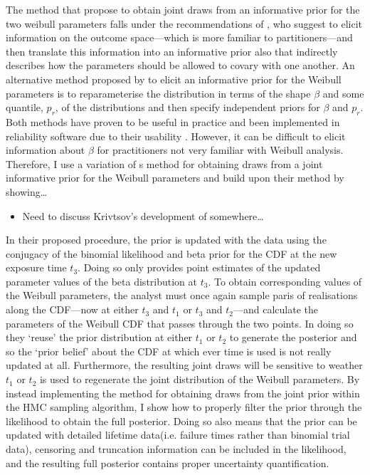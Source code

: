 The method that \citet{kaminskiy2005} propose to obtain joint draws from an informative prior for the two weibull parameters falls under the recommendations of \citet{gelman_workflow_2020}, who suggest to elicit information on the outcome space---which is more familiar to partitioners---and then translate this information into an informative prior also that indirectly describes how the parameters should be allowed to covary with one another. An alternative method proposed by \citep{Meeker2022} to elicit an informative prior for the Weibull parameters is to reparameterise the distribution in terms of the shape $\beta$ and some quantile, $p_r$, of the distributions and then specify independent priors for $\beta$ and $p_r$. Both methods have proven to be useful in practice and been implemented in reliability software due to their usability \citep{Krivtsov}. However, it can be difficult to elicit information about $\beta$ for practitioners not very familiar with Weibull analysis. Therefore, I use a variation of \citeauthor{kaminskiy2005}s method for obtaining draws from a joint informative prior for the Weibull parameters and build upon their method by showing\ldots
\begin{itemize}
    \item Need to discuss Krivtsov's development of \citet{kaminskiy2005} somewhere\ldots
\end{itemize}

In their proposed procedure, the prior is updated with the data using the conjugacy of the binomial likelihood and beta prior for the CDF at the new exposure time $t_3$. Doing so only provides point estimates of the updated parameter values of the beta distribution at $t_3$. To obtain corresponding values of the Weibull parameters, the analyst must once again sample paris of realisations along the CDF---now at either $t_3$ and $t_1$ or $t_3$ and $t_2$---and calculate the parameters of the Weibull CDF that passes through the two points. In doing so they `reuse' the prior distribution at either $t_1$ or $t_2$ to generate the posterior and so the `prior belief' about the CDF at which ever time is used is not really updated at all. Furthermore, the resulting joint draws will be sensitive to weather $t_1$ or $t_2$ is used to regenerate the joint distribution of the Weibull parameters. By instead implementing the method for obtaining draws from the joint prior within the HMC sampling algorithm, I show how to properly filter the prior through the likelihood to obtain the full posterior. Doing so also means that the prior can be updated with detailed lifetime data(i.e. failure times rather than binomial trial data), censoring and truncation information can be included in the likelihood, and the resulting full posterior contains proper uncertainty quantification. 

